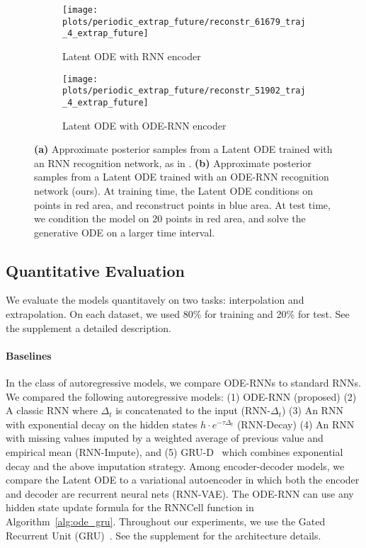 \documentclass{article}
\begin{document}
\begin{figure}[h]
	\centering
    \begin{subfigure}[b]{0.48\columnwidth}
    	\centering
    	\small
    	\caption{Latent ODE with RNN encoder}
        \texttt{[image: plots/periodic\_extrap\_future/reconstr\_61679\_traj\_4\_extrap\_future]}
    \end{subfigure}
\begin{subfigure}[b]{0.48\columnwidth}
    	\centering
    	\small
    	\caption{Latent ODE with ODE-RNN encoder}
        \texttt{[image: plots/periodic\_extrap\_future/reconstr\_51902\_traj\_4\_extrap\_future]}
    \end{subfigure}
\caption{\textbf{(a)} Approximate posterior samples from a Latent ODE trained with an RNN recognition network, as in \cite{NeuralODE}.
    \textbf{(b)} Approximate posterior samples from a Latent ODE trained with an ODE-RNN recognition network (ours).
    At training time, the Latent ODE conditions on points in red area, and reconstruct points in blue area.
    At test time, we condition the model on 20 points in red area, and solve the generative ODE on a larger time interval.}
    \label{fig:periodic_extrap}
\end{figure}




\subsection{Quantitative Evaluation}

We evaluate the models quantitavely on two tasks: interpolation and extrapolation.
On each dataset, we used 80\% for training and 20\% for test.
See the supplement a detailed description.

\paragraph{Baselines}
In the class of autoregressive models, we compare ODE-RNNs to standard RNNs.
We compared the following autoregressive models:
(1) ODE-RNN (proposed)
(2) A classic RNN where $\Delta_t$ is concatenated to the input (RNN-$\Delta_t$)
(3) An RNN with exponential decay on the hidden states $h \cdot e^{-\tau \Delta_t}$ (RNN-Decay)
(4) An RNN with missing values imputed by a weighted average of previous value and empirical mean (RNN-Impute), and
(5) GRU-D~\citep{che_sontag_2018} which combines exponential decay and the above imputation strategy.
Among encoder-decoder models, we compare the Latent ODE to a variational autoencoder in which both the encoder and decoder are recurrent neural nets (RNN-VAE). 
The ODE-RNN can use any hidden state update formula for the RNNCell function in Algorithm~\ref{alg:ode_gru}.
Throughout our experiments, we use the Gated Recurrent Unit (GRU)~\citep{gru_cho_2014}. See the supplement for the architecture details.
\end{document}
